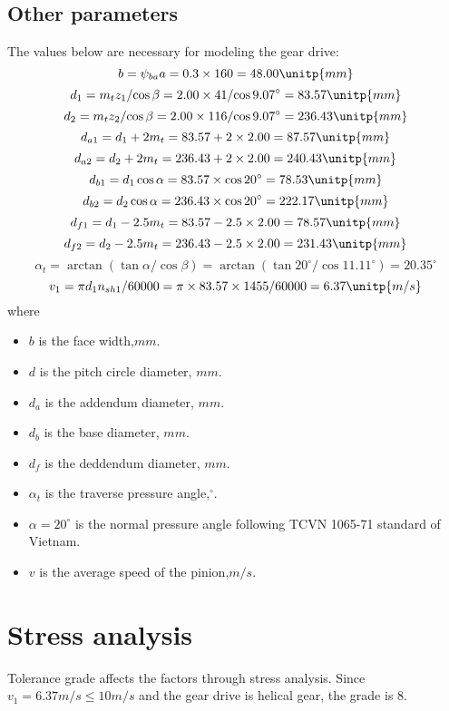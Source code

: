 \subsection{Other parameters}
The values below are necessary for modeling the gear drive:\\
\[ b = \psi_{ba}a = 0.3\times 160= 48.00\unitp{mm}\]
\[ d_1 = {m_tz_1}/{\cos\beta} = {2.00\times 41}/{\cos9.07^\circ} = 83.57\unitp{mm}\]
\[ d_2 = {m_tz_2}/{\cos\beta} = {2.00\times 116}/{\cos9.07^\circ} = 236.43\unitp{mm}\]
\[ d_{a1} = d_1 + 2m_t = 83.57 + 2\times 2.00 = 87.57\unitp{mm}\]
\[ d_{a2} = d_2 + 2m_t = 236.43 + 2\times 2.00 = 240.43\unitp{mm}\]
\[ d_{b1} = d_1\cos\alpha = 83.57\times \cos 20^\circ = 78.53\unitp{mm}\]
\[ d_{b2} = d_2\cos\alpha = 236.43\times \cos 20^\circ = 222.17 \unitp{mm}\]
\[ d_{f1} = d_1 - 2.5m_t = 83.57 - 2.5\times 2.00 = 78.57\unitp{mm}\]
\[ d_{f2} = d_2 - 2.5m_t = 236.43 - 2.5\times 2.00 = 231.43\unitp{mm}\]
\[ \alpha_t = \arctan\left({\tan\alpha}/{\cos\beta}\right) = \arctan\left({\tan 20^\circ}/{\cos 11.11^\circ}\right) = 20.35^\circ\]
\[ v_1 = {\pi d_1n_{sh1}}/{60000} = {\pi \times 83.57 \times 1455}/{60000} = 6.37\unitp{m/s}\]
where
\begin{itemize}
	\item $ b $ is the face width,$ \unit{mm} $.
	\item $ d $ is the pitch circle diameter, $ \unit{mm} $.
	\item $ d_a $ is the addendum diameter, $ \unit{mm} $.
	\item $ d_b $ is the base diameter, $ \unit{mm} $.
	\item $ d_f $ is the deddendum diameter, $ \unit{mm} $.
	\item $ \alpha_t $ is the traverse pressure angle,$ ^\circ $.
	\item $ \alpha=20^\circ $ is the normal pressure angle following TCVN 1065-71 standard of Vietnam.
	\item $ v $ is the average speed of the pinion,$ \unit{m/s} $.
\end{itemize}

\section{Stress analysis}
Tolerance grade affects the factors through stress analysis. Since $ v_1=6.37 \unit{m/s} \leq 10 \unit{m/s} $ and the gear drive is helical gear, the grade is 8.
